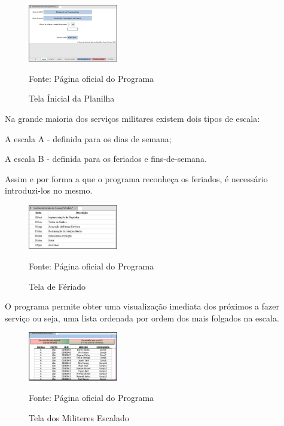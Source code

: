 \begin{figure}[!htb]
    \centering
    \caption{Tela Ínicial da Planilha}
    \includegraphics[width=0.35\textwidth]{images/04 - ESUM.png}

    {\footnotesize Fonte: Página oficial do Programa\protect\footnotemark}
    \label{fig:arduino_uno}
\end{figure}

Na grande maioria dos serviços militares existem dois tipos de escala:

A escala A - definida para os dias de semana;

A escala B - definida para os feriados e fins-de-semana.

Assim e por forma a que o programa reconheça os feriados, é necessário introduzi-los no mesmo.

\begin{figure}[!htb]
    \centering
    \caption{Tela de Fériado}
    \includegraphics[width=0.35\textwidth]{images/03 - ESUM.png}

    {\footnotesize Fonte: Página oficial do Programa\protect\footnotemark}
    \label{fig:arduino_uno}
\end{figure}

O programa permite obter uma visualização imediata dos próximos a fazer serviço ou seja, uma lista ordenada por ordem dos mais folgados na escala.


\begin{figure}[!htb]
    \centering
    \caption{Tela dos Militeres Escalado}
    \includegraphics[width=0.35\textwidth]{images/02 - ESUM.png}

    {\footnotesize Fonte: Página oficial do Programa\protect\footnotemark}
    \label{fig:arduino_uno}
\end{figure}


